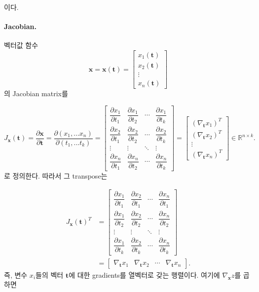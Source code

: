 \documentclass[11pt,a4paper]{article}
\begin{document}
이다.


\paragraph{Jacobian.}

벡터값 함수
\[
\mathbf x=\mathbf x(\mathbf t)
=
\begin{bmatrix}
x_1(\mathbf t)\\
x_2(\mathbf t)\\
\vdots\\
x_n(\mathbf t)
\end{bmatrix}
\]
의 Jacobian matrix를

\[
\boxed{
J_{\mathbf x}(\mathbf t)
=
\frac{\partial \mathbf x}{\partial \mathbf t}
=\frac{\partial (x_1,...x_n)}{\partial (t_1,...t_k)}=
\begin{bmatrix}
\dfrac{\partial x_1}{\partial t_1}
&
\dfrac{\partial x_1}{\partial t_2}
&
\cdots
&
\dfrac{\partial x_1}{\partial t_k}
\\[0.9em]
\dfrac{\partial x_2}{\partial t_1}
&
\dfrac{\partial x_2}{\partial t_2}
&
\cdots
&
\dfrac{\partial x_2}{\partial t_k}
\\
\vdots & \vdots & \ddots & \vdots
\\
\dfrac{\partial x_n}{\partial t_1}
&
\dfrac{\partial x_n}{\partial t_2}
&
\cdots
&
\dfrac{\partial x_n}{\partial t_k}
\end{bmatrix}
=
\begin{bmatrix}
(\nabla_{\mathbf t}x_1)^T\\
(\nabla_{\mathbf t}x_2)^T\\
\vdots\\
(\nabla_{\mathbf t}x_n)^T
\end{bmatrix}
\in\mathbb R^{n\times k}.
}
\]
로 정의한다.
따라서 그 transpose는

\[
\begin{aligned}
J_{\mathbf x}(\mathbf t)^T
&=
\begin{bmatrix}
\dfrac{\partial x_1}{\partial t_1}
&
\dfrac{\partial x_2}{\partial t_1}
&
\cdots
&
\dfrac{\partial x_n}{\partial t_1}
\\[0.9em]
\dfrac{\partial x_1}{\partial t_2}
&
\dfrac{\partial x_2}{\partial t_2}
&
\cdots
&
\dfrac{\partial x_n}{\partial t_2}
\\
\vdots & \vdots & \ddots & \vdots
\\
\dfrac{\partial x_1}{\partial t_k}
&
\dfrac{\partial x_2}{\partial t_k}
&
\cdots
&
\dfrac{\partial x_n}{\partial t_k}
\end{bmatrix}
\\[1em]
&=
\begin{bmatrix}
\nabla_{\mathbf t}x_1
&
\nabla_{\mathbf t}x_2
&
\cdots
&
\nabla_{\mathbf t}x_n
\end{bmatrix}.
\end{aligned}
\]
즉, 변수 $x_i$들의 벡터 $\mathbf{t}$에 대한 gradients를 열벡터로 갖는 행렬이다. 여기에 $\nabla_{\mathbf x}z$를 곱하면
\end{document}
